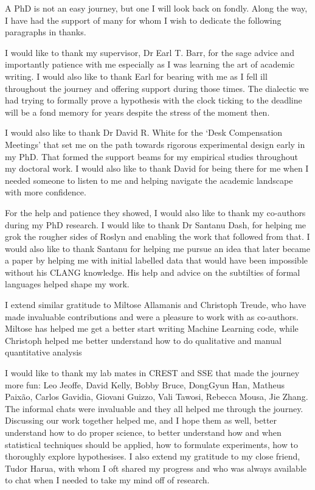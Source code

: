 \begin{acknowledgements}
    
A PhD is not an easy journey, but one I will look back on fondly. Along the way,
I have had the support of many for whom I wish to dedicate the following
paragraphs in thanks.

I would like to thank my supervisor, Dr Earl T. Barr, for the sage advice and
importantly patience with me especially as I was learning the art of
academic writing. I would also like to thank Earl for bearing with me as I fell
ill throughout the journey and offering support during those times. The
dialectic we had trying to formally prove a hypothesis with the clock ticking to
the deadline will be a fond memory for years despite the stress of the moment
then.

I would also like to thank Dr David R. White for the `Desk Compensation
Meetings' that set me on the path towards rigorous experimental design early in
my PhD. That formed the support beams for my empirical studies throughout my
doctoral work. I would also like to thank David for being there for me when I
needed someone to listen to me and helping navigate the academic landscape with
more confidence.

For the help and patience they showed, I would also like to thank my co-authors
during my PhD research. I would like to thank Dr Santanu Dash, for helping me
grok the rougher sides of Roslyn and enabling the work that followed from that.
I would also like to thank Santanu for helping me pursue an idea that later
became a paper by helping me with initial labelled data that would have been
impossible without his CLANG knowledge. His help and advice on the subtilties of
formal languages helped shape my work.

I extend similar gratitude to Miltose Allamanis and Christoph Treude, who have
made invaluable contributions and were a pleasure to work with as co-authors.
Miltose has helped me get a better start writing Machine Learning code, while
Christoph helped me better understand how to do qualitative and manual
quantitative analysis

I would like to thank my lab mates in CREST and SSE that made the journey more
fun: Leo Jeoffe, David Kelly, Bobby Bruce, DongGyun Han, Matheus Paix\~ao,
Carlos Gavidia, Giovani Guizzo, Vali Tawosi, Rebecca Mousa, Jie Zhang. The
informal chats were invaluable and they all helped me through the journey.
Discussing our work together helped me, and I hope them as well, better
understand how to do proper science, to better understand how and when
statistical techniques should be applied, how to formulate experiments, how to
thoroughly explore hypothesises. I also extend my gratitude to my close friend,
Tudor Harua, with whom I oft shared my progress and who was always
available to chat when I needed to take my mind off of research.


\end{acknowledgements}
